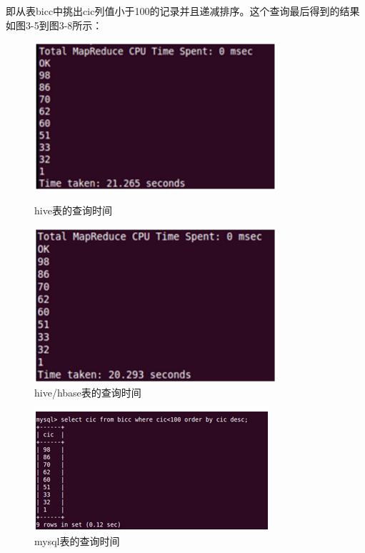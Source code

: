 即从表bicc中挑出cic列值小于100的记录并且递减排序。这个查询最后得到的结果如图3-5到图3-8所示：
\begin{description}

\item
\begin{figure}[h]
\begin{minipage}[t]{0.45\linewidth}
\centering
\includegraphics[width=0.8\textwidth]{photo/xjh3.png}
\caption{hive表的查询时间}
\end{minipage}
\hfill
\begin{minipage}[t]{0.45\linewidth}
\centering
\includegraphics[width=0.8\textwidth]{photo/xjh4.png}
\caption{hive/hbase表的查询时间}
\end{minipage}
\end{figure}

\item
\begin{figure}[!ht]
\centering
\includegraphics[]{photo/xjm3.png} 
\caption{mysql表的查询时间}
\end{figure} 


\end{description}

